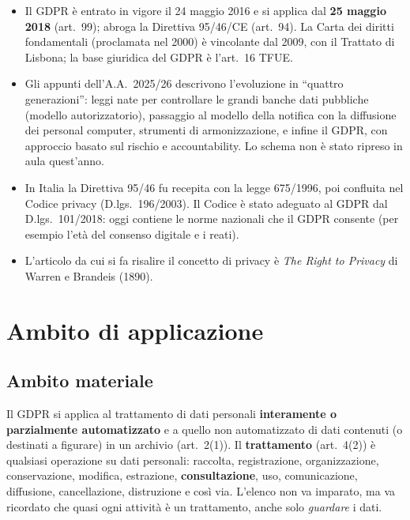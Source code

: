 \begin{integrazione}
\begin{itemize}
  \item Il GDPR è entrato in vigore il 24 maggio 2016 e si applica dal \textbf{25 maggio 2018}
    (art.~99); abroga la Direttiva 95/46/CE (art.~94). La Carta dei diritti fondamentali (proclamata nel
    2000) è vincolante dal 2009, con il Trattato di Lisbona; la base giuridica del GDPR è l'art.~16 TFUE.
  \item Gli appunti dell'A.A.~2025/26 descrivono l'evoluzione in ``quattro generazioni'': leggi nate per
    controllare le grandi banche dati pubbliche (modello autorizzatorio), passaggio al modello della
    notifica con la diffusione dei personal computer, strumenti di armonizzazione, e infine il GDPR, con
    approccio basato sul rischio e accountability. Lo schema non è stato ripreso in aula quest'anno.
  \item In Italia la Direttiva 95/46 fu recepita con la legge 675/1996, poi confluita nel Codice privacy
    (D.lgs.~196/2003). Il Codice è stato adeguato al GDPR dal D.lgs.~101/2018: oggi contiene le
    norme nazionali che il GDPR consente (per esempio l'età del consenso digitale e i reati).
  \item L'articolo da cui si fa risalire il concetto di privacy è \emph{The Right to Privacy} di Warren e
    Brandeis (1890).
\end{itemize}
\end{integrazione}

\section{Ambito di applicazione}
\label{sec:gdpr-ambito}

\subsection{Ambito materiale}
Il GDPR si applica al trattamento di dati personali \textbf{interamente o parzialmente automatizzato}
e a quello non automatizzato di dati contenuti (o destinati a figurare) in un archivio (art.~2(1)). Il
\textbf{trattamento} (art.~4(2)) è qualsiasi operazione su dati personali: raccolta, registrazione,
organizzazione, conservazione, modifica, estrazione, \textbf{consultazione}, uso, comunicazione,
diffusione, cancellazione, distruzione e così via. L'elenco non va imparato, ma va ricordato che quasi
ogni attività è un trattamento, anche solo \emph{guardare} i dati.

